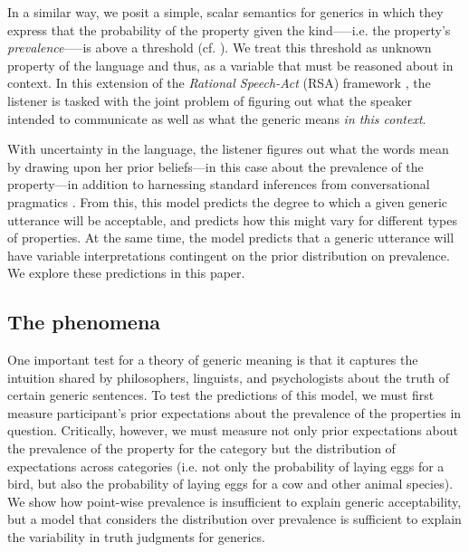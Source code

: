 \documentclass[10pt,letterpaper]{article}
\begin{document}
In a similar way, we posit a simple, scalar semantics for generics in which they express that the probability of the property given the kind-----i.e. the property's \emph{prevalence}-----is above a threshold (cf. ). We treat this threshold as unknown property of the language and thus, as a variable that must be reasoned about in context. In this extension of the \emph{Rational Speech-Act} (RSA) framework \cite{Frank2012,Goodman2013}, the listener is tasked with the joint problem of figuring out what the speaker intended to communicate as well as what the generic means \emph{in this context}. 

With uncertainty in the language, the listener figures out what the words mean by drawing upon her prior beliefs---in this case about the prevalence of the property---in addition to harnessing standard inferences from conversational pragmatics \cite{Clark1996, Grice1975, Levinson2000}. From this, this model predicts the degree to which a given generic utterance will be acceptable, and predicts how this might vary for different types of properties. At the same time, the model predicts that a generic utterance will have variable interpretations contingent on the prior distribution on prevalence. We explore these predictions in this paper.
%
\subsection{The phenomena}

One important test for a theory of generic meaning is that it captures the intuition shared by philosophers, linguists, and psychologists about the truth of certain generic sentences. To test the predictions of this model, we must first measure participant's prior expectations about the prevalence of the properties in question. Critically, however, we must measure not only prior expectations about the prevalence of the property for the category but the distribution of expectations across categories (i.e. not only the probability of laying eggs for a bird, but also the probability of laying eggs for a cow and other animal species).  We show how point-wise prevalence is insufficient to explain generic acceptability, but a model that considers the distribution over prevalence is sufficient to explain the variability in truth judgments for generics.
\end{document}

